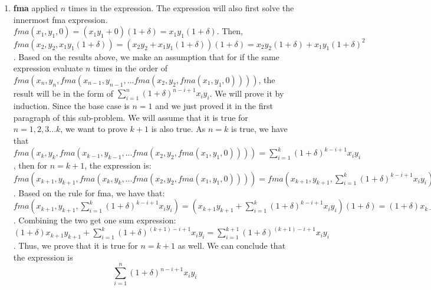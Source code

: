 \documentclass[11pt]{article}
\begin{document}
\begin{solution}
\begin{enumerate}
        \newpage

        \item
            \textbf {fma} applied $n$ times in the expression. The expression will also first solve the innermost fma expression. $fma(x_1,y_1,0) = (x_1y_1 + 0)(1+\delta) = x_1y_1(1+\delta)$. Then, $fma(x_2,y_2,x_1y_1(1+\delta)) = (x_2y_2 + x_1y_1(1+\delta))(1+\delta) = x_2y_2(1+\delta) + x_1y_1(1+\delta)^2$. 
            \newline
            Based on the results above, we make an assumption that for if the same expression evaluate $n$ times in the order of $fma(x_n,y_n,fma(x_{n-1},y_{n-1},...fma(x_2,y_2,fma(x_1,y_1,0))))$, the result will be in the form of $\sum_{i = 1}^{n}(1+\delta)^{n-i+1}x_iy_i$. We will prove it by induction.
            \newline
            \newline
            Since the base case is $n=1$ and we just proved it in the first paragraph of this sub-problem. We will assume that it is true for $n=1,2,3...k$, we want to prove $k+1$ is also true. 
            \newline
            As $n=k$ is true, we have that $fma(x_k,y_k,fma(x_{k-1},y_{k-1},...fma(x_2,y_2,fma(x_1,y_1,0)))) = \sum_{i = 1}^{k}(1+\delta)^{k-i+1}x_iy_i$, then for $n=k+1$, the expression is:
            \newline
            $fma(x_{k+1},y_{k+1},fma(x_k,y_k,...fma(x_2,y_2,fma(x_1,y_1,0)))) = fma(x_{k+1},y_{k+1},\sum_{i = 1}^{k}(1+\delta)^{k-i+1}x_iy_i)$. 
            \newline
            Based on the rule for fma, we have that:$fma(x_{k+1},y_{k+1},\sum_{i=1}^{k}(1+\delta)^{k-i+1}x_iy_i) = (x_{k+1}y_{k+1} + \sum_{i=1}^{k}(1+\delta)^{k-i+1}x_iy_i)(1+\delta) = (1+\delta)x_{k+1}y_{k+1} + \sum_{i=1}^{k}(1+\delta)^{(k+1)-i+1}x_iy_i$. Combining the two get one sum expression: $(1+\delta)x_{k+1}y_{k+1} + \sum_{i=1}^{k}(1+\delta)^{(k+1)-i+1}x_iy_i = \sum_{i=1}^{k+1}(1+\delta)^{(k+1)-i+1}x_iy_i$. Thus, we prove that it is true for $n=k+1$ as well. We can conclude that the expression is  
            $$\sum_{i = 1}^{n}(1+\delta)^{n-i+1}x_iy_i$$
            
\end{enumerate}

\end{solution}
\end{document}
